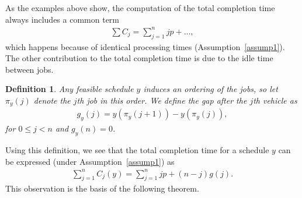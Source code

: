 \documentclass{article}
\theoremstyle{definition}
\theoremstyle{plain}
\newtheorem{define}{Definition}[section]
\begin{document}
As the examples above show, the computation of the total completion time always includes a common term
\begin{align*}
  \sum C_{j} = \sum_{j=1}^{n} jp + \dots ,
\end{align*}
which happens because of identical processing times
(Assumption~\ref{assump1}).
The other contribution to the total completion time is due to the idle time between jobs.

\begin{define}
  Any feasible schedule $y$ induces an ordering of the jobs, so let $\pi_{y}(j)$ denote the $j$th job in this order. We define the {\normalfont gap after the $j$th vehicle} as
  \begin{align}
    g_{y}(j) = y(\pi_{y}(j+1)) - y(\pi_{y}(j)) ,
  \end{align}
  for $0 \leq j < n$ and $g_{y}(n) = 0$.
\end{define}

Using this definition, we see that the total completion time for a schedule $y$ can be expressed (under Assumption~\ref{assump1}) as
\begin{align}
  \sum_{j=1}^{n} C_{j}(y) = \sum_{j=1} ^{n} jp + (n-j) g(j) .
\end{align}
This observation is the basis of the following theorem.
\end{document}
